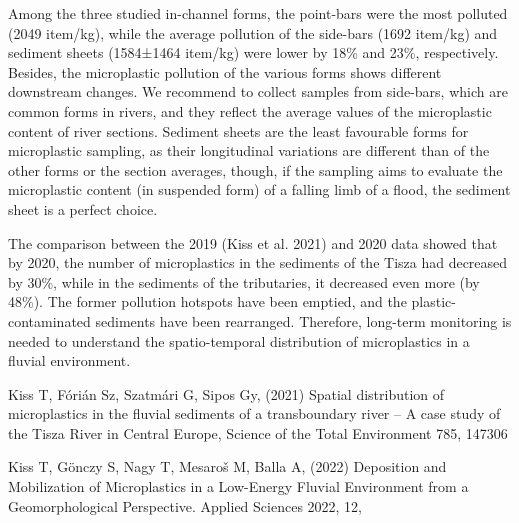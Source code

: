 {Among the three studied in-channel forms, the point-bars were the most polluted (2049 item/kg), while the average pollution of the side-bars (1692 item/kg) and sediment sheets (1584±1464 item/kg) were lower by 18\% and 23\%, respectively. Besides, the microplastic pollution of the various forms shows different downstream changes. We recommend to collect samples from side-bars, which are common forms in rivers, and they reflect the average values of the microplastic content of river sections. Sediment sheets are the least favourable forms for microplastic sampling, as their longitudinal variations are different than of the other forms or the section averages, though, if the sampling aims to evaluate the microplastic content (in suspended form) of a falling limb of a flood, the sediment sheet is a perfect choice.

The comparison between the 2019 (Kiss et al. 2021) and 2020 data showed that by 2020, the number of microplastics in the sediments of the Tisza had decreased by 30\%, while in the sediments of the tributaries, it decreased even more (by 48\%). The former pollution hotspots have been emptied, and the plastic-contaminated sediments have been rearranged. Therefore, long-term monitoring is needed to understand the spatio-temporal distribution of microplastics in a fluvial environment.
}
{Kiss T, Fórián Sz, Szatmári G, Sipos Gy, (2021) Spatial distribution of microplastics in the fluvial sediments of a transboundary river – A case study of the Tisza River in Central Europe, Science of the Total Environment 785, 147306

Kiss T, Gönczy S, Nagy T, Mesaroš M, Balla A, (2022) Deposition and Mobilization of Microplastics in a Low-Energy Fluvial Environment from a Geomorphological Perspective. Applied Sciences 2022, 12, 
}

